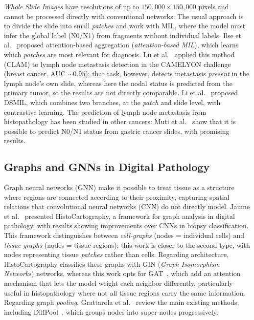 \documentclass[10pt,a4paper,twocolumn,twoside]{article}
\begin{document}
\textit{Whole Slide Images} have resolutions of up to $150,000 \times 150,000$
pixels and cannot be processed directly with conventional networks. The usual approach
is to divide the slide into small \textit{patches} and work with MIL, where the model must
infer the global label (N0/N1) from fragments without
individual labels. Ilse et al.~\cite{ilse2018attentionbaseddeepmultipleinstance}
proposed attention-based aggregation (\textit{attention-based MIL}), which learns which
\textit{patches} are most relevant for diagnosis. Lu et al.~\cite{lu2020dataefficientweaklysupervised}
applied this method (CLAM) to lymph node metastasis detection in the CAMELYON challenge
(breast cancer, AUC $\sim\!0.95$); that task, however, detects metastasis \emph{present}
in the lymph node's own slide, whereas here the nodal status is predicted from the
primary tumor, so the results are not directly comparable. Li et
al.~\cite{li2021dualstreammultipleinstancelearning} proposed DSMIL, which combines two
branches, at the \textit{patch} and slide level, with contrastive learning. The
prediction of lymph node metastasis from histopathology has been studied in other cancers:
Muti et al.~\cite{muti2023deep} show that it is possible to predict N0/N1 status from
gastric cancer slides, with promising results.

\subsection{Graphs and GNNs in Digital Pathology}

Graph neural networks (GNN) make it possible
to treat tissue as a structure where
regions are connected according to their proximity, capturing spatial relations that
convolutional neural networks (CNN) do not directly model. Jaume et al.~\cite{jaume2021histocartographytoolkitgraphanalytics}
presented HistoCartography, a framework for graph analysis in digital
pathology, with results showing improvements over CNNs in biopsy
classification. This framework distinguishes between \textit{cell-graphs} (nodes = individual
cells) and \textit{tissue-graphs} (nodes = tissue regions); this work is closer
to the second type, with nodes representing tissue \textit{patches} rather than cells.
Regarding architecture, HistoCartography classifies these graphs with GIN
(\textit{Graph Isomorphism Networks}) networks, whereas this work opts for
GAT~\cite{veličković2018graphattentionnetworks}, which add an attention mechanism that
lets the model weight each neighbor differently, particularly useful in
histopathology where not all tissue regions carry the same information. Regarding
graph \textit{pooling}, Grattarola et al.~\cite{Grattarola_2024} review the
main existing methods, including DiffPool~\cite{ying2019hierarchicalgraphrepresentationlearning},
which groups nodes into super-nodes progressively.
\end{document}
